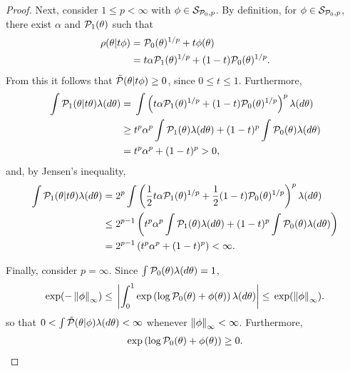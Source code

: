 \begin{proof}
Next, consider $1 \le p < \infty$ with $\phi \in \mathcal{S}_{\mathcal{P}_{0},p}$.  By definition,
for $\phi \in \mathcal{S}_{\mathcal{P}_{0},p}$, there exist $\alpha$ and $\mathcal{P}_{1}(\theta)$ such that
%
\begin{align*}
%
\rho(\theta \vert \t \phi) ={}&
    \pbase(\theta)^{1/p} + \t \phi(\theta)
\\={}& \t \alpha \palt(\theta)^{1/p} + (1- \t) \pbase(\theta)^{1/p}.
%
\end{align*}
%
From this it follows that $\tilde{\mathcal{P}}(\theta \vert t \phi) \ge 0$, since $0 \le t
\le 1$.  Furthermore,
%
\begin{align*}
%
\int \palt(\theta \vert \t \theta) \lambda(d\theta) ={}&
\int \left(\t \alpha \palt(\theta)^{1/p} +
           (1- \t) \pbase(\theta)^{1/p} \right)^{p} \lambda(d\theta)
\\\ge{}&
\t^p \alpha^p \int \palt(\theta) \lambda(d\theta) +
    (1- \t)^p \int \pbase(\theta) \lambda(d\theta)
\\={}& \t^p \alpha^p + (1- \t)^p > 0,
%
\end{align*}
%
and, by Jensen's inequality,
%
\begin{align*}
%
\int \palt(\theta \vert \t \theta) \lambda(d\theta) ={}&
2^p \int \left(\frac{1}{2} \t \alpha \palt(\theta)^{1/p} +
           \frac{1}{2} (1- \t) \pbase(\theta)^{1/p} \right)^{p} \lambda(d\theta)
\\\le{}&
%
2^{p-1} \left(
    \t^p \alpha^p \int \palt(\theta) \lambda(d\theta) +
    (1- \t)^p \int  \pbase(\theta)\lambda(d\theta)
\right)
\\={}& 2^{p-1} \left( \t^p \alpha^p + (1- \t)^p\right) < \infty.
%
\end{align*}

Finally, consider $p = \infty$.  Since $\int \mathcal{P}_{0}(\theta) \lambda(d\theta) = 1$,
%
\begin{align*}
%
\exp(-\norminf{\phi}) \le{}
\abs{\int_0^1 \exp\left(\log \pbase(\theta) + \phi(\theta)\right) \lambda(d\theta)}
\le{}
\exp(\norminf{\phi}).
%
\end{align*}
%
so that $0 < \int \tilde{\mathcal{P}}(\theta \vert \phi) \lambda(d\theta) < \infty$
whenever $\left\Vert\phi\right\Vert_{\infty} < \infty$.  Furthermore,
%
\begin{align*}
%
\exp\left(\log \pbase(\theta) + \phi(\theta)\right) \ge 0.
%
\end{align*}
%
\end{proof}






